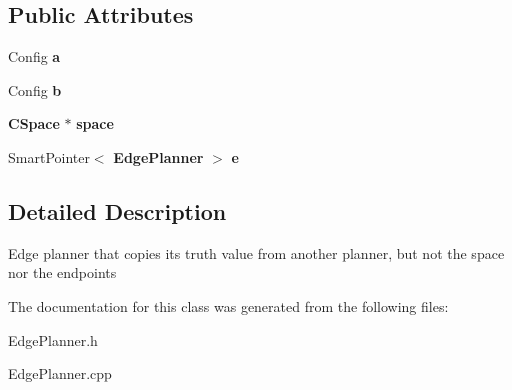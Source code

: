 \subsection*{Public Attributes}
\begin{DoxyCompactItemize}
\item 
Config {\bfseries a}\label{classPiggybackEdgePlanner_a4c28f1ae75632a7a769c366ce9bd8594}

\item 
Config {\bfseries b}\label{classPiggybackEdgePlanner_a57d6166f6d0d62234940d83fe4c30553}

\item 
{\bf C\+Space} $\ast$ {\bfseries space}\label{classPiggybackEdgePlanner_a17ee36c4677e097582a8a826441eb434}

\item 
Smart\+Pointer$<$ {\bf Edge\+Planner} $>$ {\bfseries e}\label{classPiggybackEdgePlanner_a2626f6df43e3f41636ff1b861c989d56}

\end{DoxyCompactItemize}


\subsection{Detailed Description}
Edge planner that copies its truth value from another planner, but not the space nor the endpoints 

The documentation for this class was generated from the following files\+:\begin{DoxyCompactItemize}
\item 
Edge\+Planner.\+h\item 
Edge\+Planner.\+cpp\end{DoxyCompactItemize}
